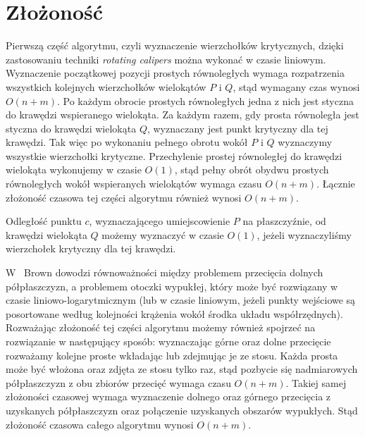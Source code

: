 \section{Złożoność}
Pierwszą część algorytmu, czyli wyznaczenie wierzchołków krytycznych,
dzięki zastosowaniu techniki \emph{rotating calipers} można wykonać w
czasie liniowym. Wyznaczenie początkowej pozycji prostych równoległych
wymaga rozpatrzenia wszystkich kolejnych wierzchołków wielokątów $P$ i
$Q$, stąd wymagany czas wynosi $O(n + m)$. Po każdym obrocie prostych
równoległych jedna z nich jest styczna do krawędzi wspieranego
wielokąta. Za każdym razem, gdy prosta równoległa jest styczna do
krawędzi wielokąta $Q$, wyznaczany jest punkt krytyczny dla tej
krawędzi. Tak więc po wykonaniu pełnego obrotu wokół $P$ i $Q$
wyznaczymy wszystkie wierzchołki krytyczne. Przechylenie prostej
równoległej do krawędzi wielokąta wykonujemy w czasie $O(1)$, stąd
pełny obrót obydwu prostych równoległych wokół wspieranych wielokątów
wymaga czasu $O(n + m)$.  Łącznie złożoność czasowa tej części
algorytmu również wynosi $O(n + m)$.

Odległość punktu $c$, wyznaczającego umiejscowienie $P$ na
płaszczyźnie, od krawędzi wielokąta $Q$ możemy wyznaczyć w czasie
$O(1)$, jeżeli wyznaczyliśmy wierzchołek krytyczny dla tej krawędzi.

W~\cite{Brown78} Brown dowodzi równoważności między problemem
przecięcia dolnych półpłaszczyzn, a problemem otoczki wypukłej, który
może być rozwiązany w czasie liniowo-logarytmicznym (lub w czasie
liniowym, jeżeli punkty wejściowe są posortowane według kolejności
krążenia wokół środka układu współrzędnych). Rozważając złożoność tej
części algorytmu możemy również spojrzeć na rozwiązanie w następujący
sposób: wyznaczając górne oraz dolne przecięcie rozważamy kolejne
proste wkładając lub zdejmując je ze stosu. Każda prosta może być
włożona oraz zdjęta ze stosu tylko raz, stąd pozbycie się nadmiarowych
półpłaszczyzn z obu zbiorów przecięć wymaga czasu $O(n + m)$. Takiej
samej złożoności czasowej wymaga wyznaczenie dolnego oraz górnego
przecięcia z uzyskanych półpłaszczyzn oraz połączenie uzyskanych
obszarów wypukłych. Stąd złożoność czasowa całego algorytmu wynosi
$O(n + m)$.

